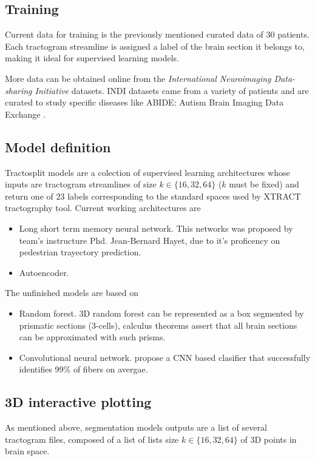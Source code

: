 \documentclass[conference]{IEEEtran}
\begin{document}
\subsection{Training}
Current data for training is the previously mentioned curated data of 30 patients. Each tractogram streamline is assigned a label of the brain section it belongs to, making it ideal for supervised learning models.

More data can be obtained online from the \textit{International Neuroimaging Data-sharing Initiative} \cite{b3} datasets. INDI datasets came from a variety of patients and are curated to study specific diseases like ABIDE: Autism Brain Imaging Data Exchange \cite{b4}.

\subsection{Model definition}
Tractosplit models are a colection of supervised learning architectures whose inputs are tractogram streamlines of size $k\in\{16, 32, 64\}$ ($k$ must be fixed) and return one of 23 labels corresponding to the standard spaces used by XTRACT \cite{b1} tractography tool. Current working architectures are
\begin{itemize}
    \item Long short term memory neural network. This networks was proposed by team's instructure Phd. Jean-Bernard Hayet, due to it's proficency on pedestrian trayectory prediction.
    \item Autoencoder.
\end{itemize}
The unfinished models are based on
\begin{itemize}
    \item Random forest. 3D random forest can be represented as a box segmented by prismatic sections (3-cells), calculus theorems assert that all brain sections can be approximated with such prisms.
    \item Convolutional neural network. \cite{b5} propose a CNN based clasifier that successfully identifies 99\% of fibers on avergae.
\end{itemize}

\subsection{3D interactive plotting}
As mentioned above, segmentation models outputs are a list of several tractogram files, composed of a list of lists size $k\in \{16, 32, 64\}$ of 3D points in brain space.
\end{document}
